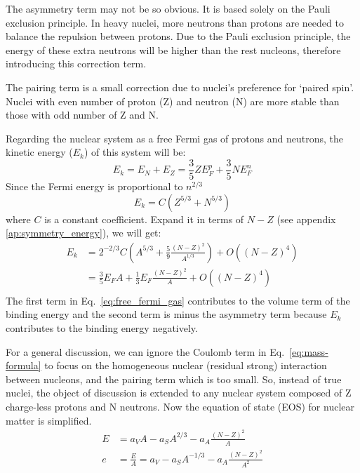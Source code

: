 The asymmetry term may not be so obvious. It is based solely on the Pauli exclusion principle. %
In heavy nuclei,
more neutrons than protons are needed to balance the repulsion between protons.
Due to the Pauli exclusion principle, the energy of these extra neutrons will be 
higher than the rest nucleons, therefore introducing this correction term.

The pairing term is a small correction due to nuclei's preference for `paired spin'. %
Nuclei with even number of proton (Z) and neutron (N) are more stable than those with odd number
of Z and N.

Regarding the nuclear system as a free Fermi gas of protons and neutrons, the 
kinetic energy ($E_k$) of this system will be:
\begin{equation}
    E_k = E_N + E_Z = \frac{3}{5}ZE_F^p + \frac{3}{5}NE_F^n
\end{equation}
Since the Fermi energy is proportional to $n^{2/3}$
\begin{equation}
    E_k = C(Z^{5/3} + N^{5/3})
\end{equation}
where $C$ is a constant coefficient. 
Expand it in terms of $N-Z$ (see appendix \ref{ap:symmetry_energy}), we will get:
\begin{equation}
    \begin{aligned}
	E_k &= 2^{-2/3}C\left(A^{5/3} + \frac{5}{9}\frac{(N-Z)^2}{A^{1/3}} \right) + O((N-Z)^4) \\
	    &= \frac{3}{5} E_F A + \frac{1}{3}E_F\frac{(N-Z)^2}{A} + O((N-Z)^4) \\
    \end{aligned}
    \label{eq:free_fermi_gas}
\end{equation}
The first term in Eq.~\ref{eq:free_fermi_gas} contributes to the volume term 
of the binding energy and the second term is minus the 
asymmetry term because $E_k$ contributes to the binding energy negatively.

For a general discussion, we can ignore the Coulomb term in Eq.~\ref{eq:mass-formula}
to focus on the homogeneous nuclear (residual strong) interaction between nucleons, 
and the pairing term which is too small.
So, instead of true nuclei, the object of discussion is extended to any nuclear 
system composed of Z charge-less protons and N neutrons. Now the equation
of state (EOS) for nuclear matter is simplified.
\begin{equation}
    \begin{aligned}
	E &= a_V A - a_S A^{2/3} - a_A\frac{(N-Z)^2}{A}  \\
	e &= \frac{E}{A} = a_V - a_S A^{-1/3} - a_A\frac{(N-Z)^2}{A^2}
    \end{aligned}
    \label{eq:modified-mass-formula-1}
\end{equation}

